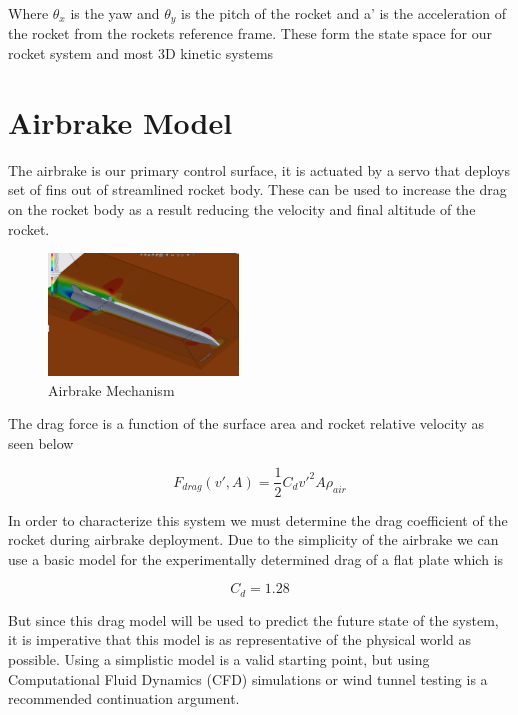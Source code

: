 \documentclass[conference, letterpaper]{IEEEtran}
\begin{document}
Where $\theta_x$ is the yaw and $\theta_y$ is the pitch of the rocket and a' is the acceleration of the rocket
from the rockets reference frame. These form the state space for our rocket system and most 3D kinetic systems

\section{Airbrake Model}
The airbrake is our primary control surface, it is actuated by a servo that deploys
set of fins out of streamlined rocket body.  These can be used to increase the drag on
the rocket body as a result reducing the velocity and final altitude of the rocket.

\begin{figure}[H]
\centering
\includegraphics[width=0.45\textwidth]{./airbrake_mechanism}
\caption{Airbrake Mechanism}
\label{fig:airbrake_mechanism}
\end{figure}

The drag force is a function of the surface area and rocket relative velocity as seen below

\begin{equation}\label{eq:3}
  F_{drag}(v', A)=\frac{1}{2}C_dv'^2A\rho_{air}
\end{equation}

In order to characterize this system we must determine the drag coefficient of the rocket
during airbrake deployment. Due to the simplicity of the airbrake we can use a basic
model for the experimentally determined drag of a flat plate\cite{nasa} which is

\begin{equation}\label{eq:4}
  C_d=1.28
\end{equation}

But since this drag model will be used to predict the future state of the system, it is
imperative that this model is as representative of the physical world as possible.  Using
a simplistic model is a valid starting point, but using Computational Fluid Dynamics (CFD)
simulations or wind tunnel testing is a recommended continuation argument.
\end{document}
